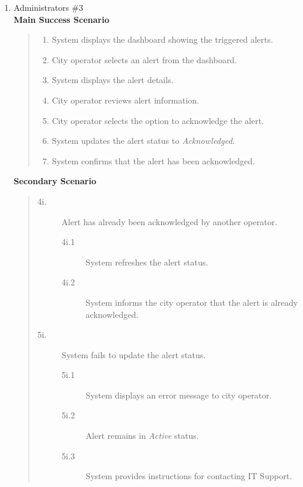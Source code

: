 \documentclass[]{article}
\begin{document}
\begin{enumerate}[{\bf BE5.}]
\begin{enumerate}[{\bf VP1.}]
			\item Administrators \#3 \\
				\textbf{Main Success Scenario} 
                    \begin{quote}
                    \begin{enumerate}[1.]
                        \item System displays the dashboard showing the triggered alerts.
                        \item City operator selects an alert from the dashboard.
                        \item System displays the alert details.
                        \item City operator reviews alert information.
                        \item City operator selects the option to acknowledge the alert.
                        \item System updates the alert status to \textit{Acknowledged}.
                        \item System confirms that the alert has been acknowledged.
                    \end{enumerate}
                    \end{quote}
                \textbf{Secondary Scenario} 
                \begin{quote}
                    \begin{description}
                        \item[\textmd{4i.}] Alert has already been acknowledged by another operator.
                        \begin{description}
                            \item[\textmd{4i.1}] System refreshes the alert status.
                            \item[\textmd{4i.2}] System informs the city operator that the alert is already acknowledged.
                        \end{description}
                        \item[\textmd{5i.}] System fails to update the alert status.
                        \begin{description}
                            \item[\textmd{5i.1}] System displays an error message to city operator.
                            \item[\textmd{5i.2}] Alert remains in \textit{Active} status.
                            \item[\textmd{5i.3}] System provides instructions for contacting IT Support.
                        \end{description}
                    \end{description}
                \end{quote}
                

\end{enumerate}
\end{enumerate}
\end{document}
